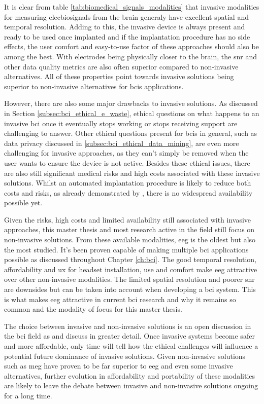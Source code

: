 It is clear from table \ref{tab:biomedical_signals_modalities} that invasive modalities for measuring \glspl{elecbiosignal} from the brain generaly have excellent spatial and temporal resolution.
Adding to this, the invasive device is always present and ready to be used once implanted and if the implantation procedure has no side effects, the user comfort and easy-to-use factor of these approaches should also be among the best.
With electrodes being physically closer to the brain, the \gls{snr} and other data quality metrics are also often superior compared to non-invasive alternatives.
All of these properties point towards invasive solutions being superior to non-invasive alternatives for \glspl{bci} applications.

However, there are also some major drawbacks to invasive solutions.
As discussed in Section \ref{subsec:bci_ethical_e_waste}, ethical questions on what happens to an invasive \gls{bci} once it eventually stops working or stops receiving support are challenging to answer.
Other ethical questions present for \glspl{bci} in general, such as data privacy discussed in \ref{subsec:bci_ethical_data_mining}, are even more challenging for invasive approaches, as they can't simply be removed when the user wants to ensure the device is not active.
Besides these ethical issues, there are also still significant medical risks and high costs associated with these invasive solutions.
Whilst an automated implantation procedure is likely to reduce both costs and risks, as already demonstrated by \citet{neuralink_whitepaper}, there is no widespread availability possible yet.

Given the risks, high costs and limited availability still associated with invasive approaches, this master thesis and most research active in the field still focus on non-invasive solutions.
From these available modalities, \gls{eeg} is the oldest but also the most studied.
It's been proven capable of making multiple \gls{bci} applications possible as discussed throughout Chapter \ref{ch:bci}.
The good temporal resolution, affordability and \gls{ux} for headset installation, use and comfort make \gls{eeg} attractive over other non-invasive modalities.
The limited spatial resolution and poorer \gls{snr} are downsides but can be taken into account when developing a \gls{bci} system.
This is what makes \gls{eeg} attractive in current \gls{bci} research and why it remains so common and the modality of focus for this master thesis.

The choice between invasive and non-invasive solutions is an open discussion in the \gls{bci} field as \citet{bci_invasive_or_not1} and \citet{bci_invasive_or_not2} discuss in greater detail.
Once invasive systems become safer and more affordable, only time will tell how the ethical challenges will influence a potential future dominance of invasive solutions.
Given non-invasive solutions such as \gls{meg} have proven to be far superior to \gls{eeg} and even some invasive alternatives, further evolution in affordability and portability of these modalities are likely to leave the debate between invasive and non-invasive solutions ongoing for a long time.

